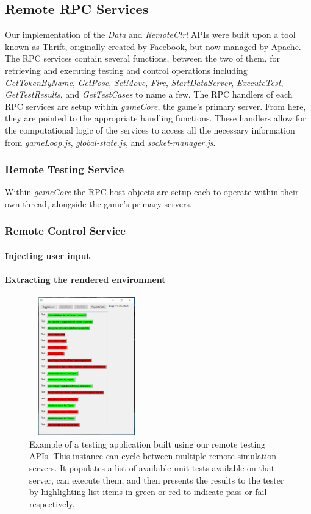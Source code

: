 \documentclass[conference]{IEEEtran}
\begin{document}
\subsection{Remote RPC Services}
Our implementation of the \textit{Data} and \textit{RemoteCtrl} APIs were built upon a tool known as Thrift, originally created by Facebook, but now managed by Apache. The RPC services contain several functions, between the two of them, for retrieving and executing testing and control operations including \textit{GetTokenByName}, \textit{GetPose}, \textit{SetMove}, \textit{Fire}, \textit{StartDataServer}, \textit{ExecuteTest}, \textit{GetTestResults}, and \textit{GetTestCases} to name a few. The RPC handlers of each RPC services are setup within \textit{gameCore}, the game's primary server. From here, they are pointed to the appropriate handling functions. These handlers allow for the computational logic of the services to access all the necessary information from \textit{gameLoop.js}, \textit{global-state.js}, and \textit{socket-manager.js}.

\subsubsection{Remote Testing Service}
Within \textit{gameCore} the RPC host objects are setup each to operate within their own thread, alongside the game's primary servers.
\subsubsection{Remote Control Service}
\paragraph{Injecting user input}
\paragraph{Extracting the rendered environment}

\begin{figure}[htbp]
\centerline{\includegraphics [width = 5cm, height = 6cm] {images/remoteTesting.PNG}}
\caption{Example of a testing application built using our remote testing APIs. This instance can cycle between multiple remote simulation servers. It populates a list of available unit tests available on that server, can execute them, and then presents the results to the tester by highlighting list items in green or red to indicate pass or fail respectively.}
\end{figure}
\end{document}

